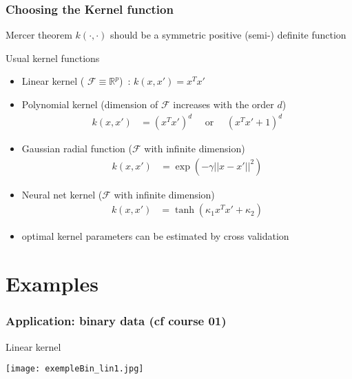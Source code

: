 \documentclass[compress, smaller, serif, 9pt]{beamer}
\newcommand{\structuretext}[1]{{\usebeamercolor[fg]{structure} #1}}
\newcommand{\doigt}{\structuretext{\noindent \Pisymbol{pzd}{43}}}
\begin{document}
\begin{frame}
  \frametitle{Choosing the Kernel function}

 \begin{block}{Mercer theorem}
 $k(\cdot,\cdot)$ should be a symmetric positive (semi-) definite function
 \end{block}

  \begin{block}{Usual kernel functions}
\begin{itemize}
 \item  Linear kernel ( $\mathcal{F} \equiv \mathbb{R}^p$)~:
 $
    k(x,x') =x^T x'
$
 \item  Polynomial kernel (dimension of $\mathcal{F}$ increases with the order $d$)
 \begin{align*}
    k(x,x') &=(x^T x')^d \quad \textrm{ or } \quad (x^T x'+1)^d
 \end{align*}
  \item Gaussian radial function ($\mathcal{F}$ with infinite dimension)
 \begin{align*}
    k(x,x') &= \exp{\left( - \gamma ||x - x'||^2\right)}
 \end{align*}
   \item  Neural net kernel ($\mathcal{F}$ with infinite dimension)
 \begin{align*}
    k(x,x') &= \tanh{\left( \kappa_1 x^T x' + \kappa_2 \right)}
 \end{align*}
\item[\doigt] optimal kernel parameters can be estimated by cross validation
\end{itemize}
 \end{block}

\end{frame}




\section*{Examples}

\begin{frame}
  \frametitle{Application: binary data  (cf course 01)}


\begin{block}{Linear kernel}
 \end{block}

\begin{center}
\texttt{[image: exempleBin\_lin1.jpg]}%
\end{center}

\end{frame}
\end{document}

